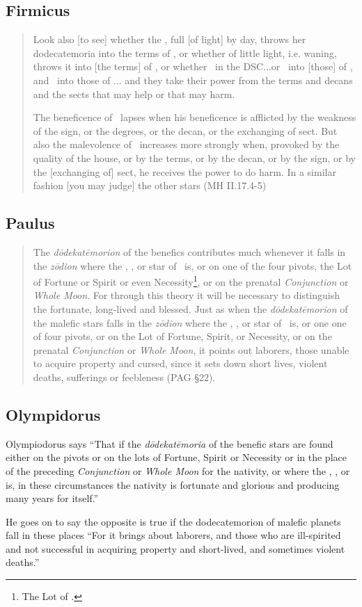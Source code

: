 \subsection{Firmicus}
\begin{quote}
Look also [to see] whether the \Moon, full [of light] by day, throws her dodecatemoria into the terms of \Mars, or whether of little light, i.e. waning, throws it into [the terms] of \Saturn, or whether \Mars\, in the DSC...or \Venus\, into [those] of \Mars, and \Mars\, into those of \Venus... and they take their power from the terms and decans and the sects that may help or that may harm.

The beneficence of \Jupiter\, lapses when his beneficence is afflicted by the weakness of the sign, or the degrees, or the decan, or the exchanging of sect. But also the malevolence of \Saturn\, increases more strongly when, provoked by the quality of the house, or by the terms, or by the decan, or by the sign, or by the [exchanging of] sect, he receives the power to do harm. In a similar fashion [you may judge] the other stars (MH II.17.4-5)
\end{quote}

\subsection{Paulus}
\begin{quote}
The \textsl{d\=odekat\=emorion} of the benefics contributes much whenever it falls in the \textsl{z\=odion} where the \Sun, \Moon, or star of \Mercury\, is, or on one of the four pivots, the Lot of Fortune or Spirit or even Necessity\footnote{The Lot of \Mercury.}, or on the prenatal \textsl{Conjunction} or \textsl{Whole Moon}. For through this theory it will be necessary to distinguish the fortunate, long-lived and blessed. Just as when the \textsl{d\=odekat\=emorion} of the malefic stars falls in the \textsl{z\=odion} where the \Sun, \Moon, or star of \Mercury\, is, or one one of four pivots, or on the Lot of Fortune, Spirit, or Necessity, or on the prenatal \textsl{Conjunction} or \textsl{Whole Moon}, it points out laborers, those unable to acquire property and cursed, since it sets down short lives, violent deaths, sufferings or feebleness (PAG \S22).
\end{quote}

\subsection{Olympidorus}
Olympiodorus says ``That if the \textsl{d\={o}dekat\={e}moria} of the benefic stars are found either on the pivots or on the lots of Fortune, Spirit or Necessity or in the place of the preceding \textsl{Conjunction} or \textsl{Whole Moon} for the nativity, or where the \Sun, \Moon, or \Mercury\, is, in these circumstances the nativity is fortunate and glorious and producing many years for itself.''

He goes on to say the opposite is true if the dodecatemorion of malefic planets fall in these places ``For it brings about laborers, and those who are ill-spirited and not successful in acquiring property and short-lived, and sometimes violent deaths.'' 
